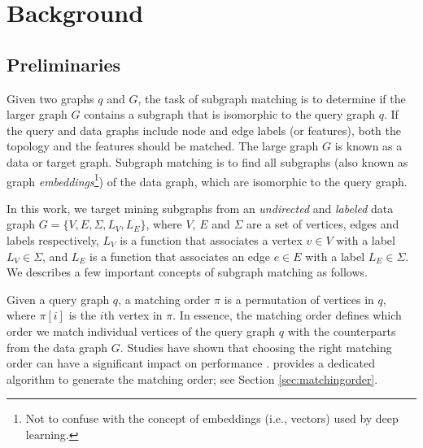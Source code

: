 \section{Background}
\subsection{Preliminaries}
Given two graphs $q$ and $G$, the task of subgraph matching is to determine if the larger graph $G$ contains a subgraph that is isomorphic
to the query graph $q$. If the query and data graphs include node and edge labels (or features), both the topology and the features should
be matched. The large graph $G$ is known as a data or target graph.  Subgraph matching is to find all subgraphs (also known as graph
\emph{embeddings}\footnote{Not to confuse with the concept of embeddings (i.e., vectors) used by deep learning.}) of the data graph, which
are isomorphic to the query graph.

In this work, we target mining subgraphs from an \emph{undirected} and \emph{labeled} data graph $G=\{V,E,\Sigma,L_V,L_E\}$, where $V$, $E$
and $\Sigma$ are a set of vertices, edges and labels respectively,  $L_V$ is a function that associates a vertex $v \in V$ with a label
$L_V \in \Sigma$, and $L_E$ is a function that associates an edge $e \in E$ with a label $L_E \in \Sigma$. We describes a few important
concepts of subgraph matching as follows.



 Given a query graph $q$, a matching order $\pi$ is a permutation of vertices in $q$, where $\pi[i]$ is the
$i$th vertex in $\pi$. In essence, the matching order defines which order we match individual vertices of the query graph $q$ with the
counterparts from the data graph $G$. Studies have shown that choosing the right matching order can have a significant impact on
performance \cite{bi2016efficient,sun2020subgraph,sun2020rapidmatch,guo2020gpu}.  \SystemName provides a dedicated algorithm to generate
the matching order; see Section \ref {sec:matchingorder}.

